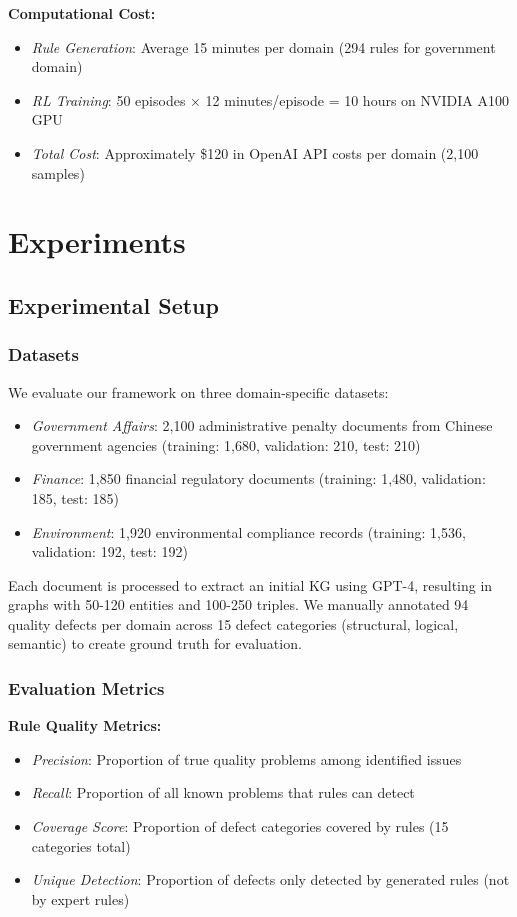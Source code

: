 \documentclass[runningheads]{llncs}
\begin{document}
\textbf{Computational Cost:}
\begin{itemize}
    \item \textit{Rule Generation}: Average 15 minutes per domain (294 rules for government domain)
    \item \textit{RL Training}: 50 episodes × 12 minutes/episode = 10 hours on NVIDIA A100 GPU
    \item \textit{Total Cost}: Approximately \$120 in OpenAI API costs per domain (2,100 samples)
\end{itemize}

\section{Experiments}

\subsection{Experimental Setup}

\subsubsection{Datasets}
We evaluate our framework on three domain-specific datasets:
\begin{itemize}
    \item \textit{Government Affairs}: 2,100 administrative penalty documents from Chinese government agencies (training: 1,680, validation: 210, test: 210)
    \item \textit{Finance}: 1,850 financial regulatory documents (training: 1,480, validation: 185, test: 185)
    \item \textit{Environment}: 1,920 environmental compliance records (training: 1,536, validation: 192, test: 192)
\end{itemize}

Each document is processed to extract an initial KG using GPT-4, resulting in graphs with 50-120 entities and 100-250 triples. We manually annotated 94 quality defects per domain across 15 defect categories (structural, logical, semantic) to create ground truth for evaluation.

\subsubsection{Evaluation Metrics}

\textbf{Rule Quality Metrics:}
\begin{itemize}
    \item \textit{Precision}: Proportion of true quality problems among identified issues
    \item \textit{Recall}: Proportion of all known problems that rules can detect
    \item \textit{Coverage Score}: Proportion of defect categories covered by rules (15 categories total)
    \item \textit{Unique Detection}: Proportion of defects only detected by generated rules (not by expert rules)
\end{itemize}
\end{document}
